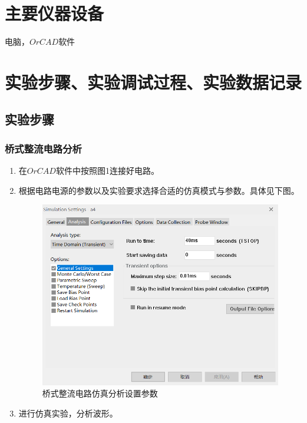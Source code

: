 \documentclass{../source/Experiment}
\begin{document}
    \section{主要仪器设备}
            电脑，$OrCAD$软件

    \section{实验步骤、实验调试过程、实验数据记录}
            \subsection{实验步骤}
                \subsubsection{桥式整流电路分析}
                    \begin{enumerate}
                        \item 在$OrCAD$软件中按照图1连接好电路。
                        \item 根据电路电源的参数以及实验要求选择合适的仿真模式与参数。具体见下图。
                        \newpage
                        \begin{figure}[h]
                            \centering
                            \includegraphics[scale = 0.6]{pic/桥式与稳压二极管/brg2.png}
                            \caption{桥式整流电路仿真分析设置参数}
                        \end{figure}
                        \item 进行仿真实验，分析波形。
                    \end{enumerate}
\end{document}
